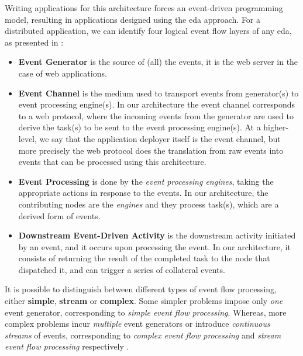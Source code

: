 \documentclass[12pt, titlepage]{uo_temp}
\begin{document}
     Writing applications for this architecture forces an event-driven programming model,
     resulting in applications designed using the \gls{eda} approach. For a distributed
     application, we can identify four logical event flow layers of any \gls{eda}, as
     presented in \cite{michelson2006event}:
     \begin{itemize}
     \item \textbf{Event Generator} is the source of (all) the events, it is the web server
       in the case of web applications.
     \item \textbf{Event Channel} is the medium used to transport events from generator(s)
       to event processing engine(s). In our architecture the event channel corresponds to a
       web protocol, where the incoming events from the generator are used to derive the
       task(s) to be sent to the event processing engine(s). At a higher-level, we say that
       the application deployer itself is the event channel, but more precisely the web
       protocol does the translation from raw events into events that can be processed
       using this architecture.
     \item \textbf{Event Processing} is done by the \emph{event processing engines},
       taking the appropriate actions in response to the events. In our architecture, the
       contributing nodes are the \emph{engines} and they process task(s), which are a
       derived form of events.
     \item \textbf{Downstream Event-Driven Activity} is the downstream activity initiated
       by an event, and it occurs upon processing the event. In our architecture, it
       consists of returning the result of the completed task to the node that dispatched
       it, and can trigger a series of collateral events.
     \end{itemize}

     It is possible to distinguish between different types of event flow processing,
     either \textbf{simple}, \textbf{stream} or \textbf{complex}. Some simpler problems
     impose only \emph{one} event generator, corresponding to \emph{simple event flow
       processing}. Whereas, more complex problems incur \emph{multiple} event generators
     or introduce \emph{continuous streams} of events, corresponding to \emph{complex
       event flow processing} and \emph{stream event flow processing} respectively
     \cite{michelson2006event}.
\end{document}
